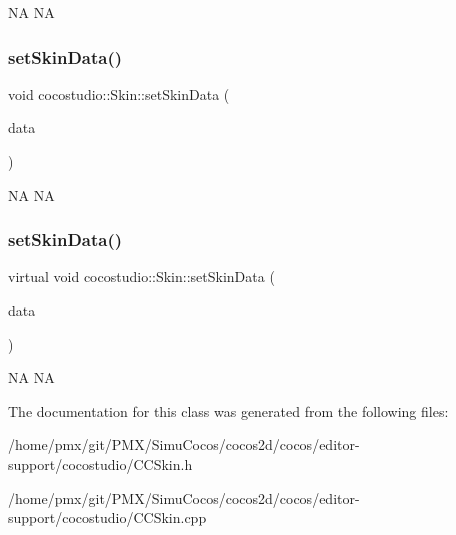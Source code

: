 NA  NA \mbox{\label{classcocostudio_1_1Skin_ae04aa81da673975be6a2973024a1ac46}} 
\subsubsection{\texorpdfstring{set\+Skin\+Data()}{setSkinData()}\hspace{0.1cm}{\footnotesize\ttfamily [1/2]}}
{\footnotesize\ttfamily void cocostudio\+::\+Skin\+::set\+Skin\+Data (\begin{DoxyParamCaption}\item[{const \hyperlink{classcocostudio_1_1BaseData}{Base\+Data} \&}]{data }\end{DoxyParamCaption})\hspace{0.3cm}{\ttfamily [virtual]}}

NA  NA \mbox{\label{classcocostudio_1_1Skin_af4d0ab0ecb523ce11215a32ade18fc05}} 
\subsubsection{\texorpdfstring{set\+Skin\+Data()}{setSkinData()}\hspace{0.1cm}{\footnotesize\ttfamily [2/2]}}
{\footnotesize\ttfamily virtual void cocostudio\+::\+Skin\+::set\+Skin\+Data (\begin{DoxyParamCaption}\item[{const \hyperlink{classcocostudio_1_1BaseData}{Base\+Data} \&}]{data }\end{DoxyParamCaption})\hspace{0.3cm}{\ttfamily [virtual]}}

NA  NA 

The documentation for this class was generated from the following files\+:\begin{DoxyCompactItemize}
\item 
/home/pmx/git/\+P\+M\+X/\+Simu\+Cocos/cocos2d/cocos/editor-\/support/cocostudio/C\+C\+Skin.\+h\item 
/home/pmx/git/\+P\+M\+X/\+Simu\+Cocos/cocos2d/cocos/editor-\/support/cocostudio/C\+C\+Skin.\+cpp\end{DoxyCompactItemize}
